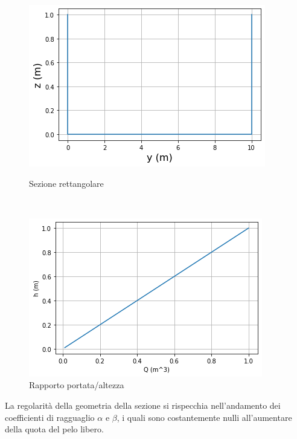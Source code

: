 \documentclass[12pt]{article} %
\begin{document}
\begin{figure}[H]
\begin{minipage}[b]{8.5cm}
\centering
    \includegraphics[width=1 \textwidth]{sezioneret.png}
    \caption{Sezione rettangolare}
    \label{fig:rettangolare_sezione} 
\end{minipage}
\ \hspace{2mm} \hspace{3mm} \
\begin{minipage}[b]{8.5cm}
    \centering
    \includegraphics[width=1 \textwidth]{rapporto portata altezzaret.png}
    \caption{Rapporto portata/altezza}
    \label{fig:rettangolare_portata/altezza}
\end{minipage}
\end{figure}

\noindent La regolarità della geometria della sezione si rispecchia nell’andamento dei coefficienti di ragguaglio $\alpha$ e $\beta$, i quali sono costantemente nulli all’aumentare della quota del pelo libero.
\end{document}
